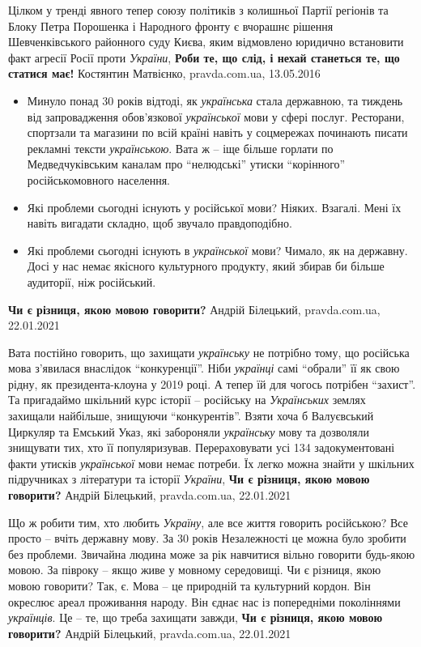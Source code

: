 Цілком у тренді явного тепер союзу політиків з колишньої Партії регіонів та
Блоку Петра Порошенка і Народного фронту є вчорашнє рішення Шевченківського
районного суду Києва, яким відмовлено юридично встановити факт агресії Росії
проти \emph{України},
\textbf{Роби те, що слід, і нехай станеться те, що статися має!}
Костянтин Матвієнко, pravda.com.ua, 13.05.2016

\begin{itemize}
\item Минуло понад 30 років відтоді, як \emph{українська} стала державною, та
        тиждень від запровадження обов'язкової \emph{української} мови у сфері
        послуг. Ресторани, спортзали та магазини по всій країні навіть у
        соцмережах починають писати рекламні тексти \emph{українською}. Вата ж
        – іще більше горлати по Медведчуківським каналам про
        \enquote{нелюдські} утиски \enquote{корінного} російськомовного
        населення.
\item Які проблеми сьогодні існують у російської мови? Ніяких. Взагалі. Мені їх навіть вигадати складно, щоб звучало правдоподібно.
\item Які проблеми сьогодні існують в \emph{української} мови? Чимало, як на
державну. Досі у нас немає якісного культурного продукту, який збирав
би більше аудиторії, ніж російський.
\end{itemize}
\textbf{Чи є різниця, якою мовою говорити?} Андрій Білецький, pravda.com.ua, 22.01.2021

Вата постійно говорить, що захищати \emph{українську} не потрібно тому, що російська
мова з'явилася внаслідок \enquote{конкуренції}.  Ніби \emph{українці} самі
\enquote{обрали} її як свою рідну, як президента-клоуна у 2019 році. А тепер їй
для чогось потрібен \enquote{захист}.  Та пригадаймо шкільний курс історії –
російську на \emph{Українських} землях захищали найбільше, знищуючи
\enquote{конкурентів}. Взяти хоча б Валуєвський Циркуляр та Емський Указ, які
забороняли \emph{українську} мову та дозволяли знищувати тих, хто її
популяризував. Перераховувати усі 134 задокументовані факти утисків
\emph{української} мови немає потреби. Їх легко можна знайти у шкільних
підручниках з літератури та історії \emph{України},
\textbf{Чи є різниця, якою мовою говорити?} Андрій Білецький, pravda.com.ua, 22.01.2021

Що ж робити тим, хто любить \emph{Україну}, але все життя говорить російською? Все
просто – вчіть державну мову. За 30 років Незалежності це можна було зробити
без проблеми. Звичайна людина може за рік навчитися вільно говорити будь-якою
мовою. За півроку – якщо живе у мовному середовищі.  Чи є різниця, якою мовою
говорити? Так, є. Мова – це природній та культурний кордон. Він окреслює ареал
проживання народу. Він єднає нас із попередніми поколіннями \emph{українців}. Це – те,
що треба захищати завжди,
\textbf{Чи є різниця, якою мовою говорити?} Андрій Білецький, pravda.com.ua, 22.01.2021

